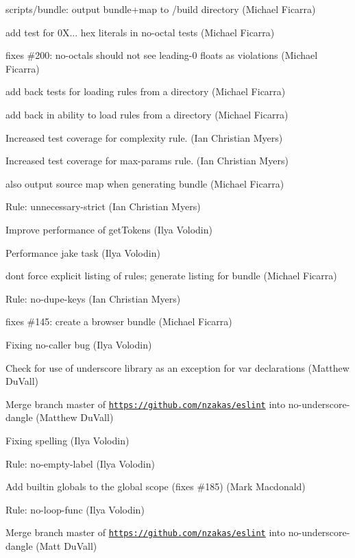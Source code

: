 \begin{DoxyItemize}
\item scripts/bundle\+: output bundle+map to /build directory (Michael Ficarra)
\item add test for 0X... hex literals in no-\/octal tests (Michael Ficarra)
\item fixes \#200\+: no-\/octals should not see leading-\/0 floats as violations (Michael Ficarra)
\item add back tests for loading rules from a directory (Michael Ficarra)
\item add back in ability to load rules from a directory (Michael Ficarra)
\item Increased test coverage for {\ttfamily complexity} rule. (Ian Christian Myers)
\item Increased test coverage for {\ttfamily max-\/params} rule. (Ian Christian Myers)
\item also output source map when generating bundle (Michael Ficarra)
\item Rule\+: unnecessary-\/strict (Ian Christian Myers)
\item Improve performance of get\+Tokens (Ilya Volodin)
\item Performance jake task (Ilya Volodin)
\item don\textquotesingle{}t force explicit listing of rules; generate listing for bundle (Michael Ficarra)
\item Rule\+: no-\/dupe-\/keys (Ian Christian Myers)
\item fixes \#145\+: create a browser bundle (Michael Ficarra)
\item Fixing no-\/caller bug (Ilya Volodin)
\item Check for use of underscore library as an exception for var declarations (Matthew Du\+Vall)
\item Merge branch \textquotesingle{}master\textquotesingle{} of \href{https://github.com/nzakas/eslint}{\tt https\+://github.\+com/nzakas/eslint} into no-\/underscore-\/dangle (Matthew Du\+Vall)
\item Fixing spelling (Ilya Volodin)
\item Rule\+: no-\/empty-\/label (Ilya Volodin)
\item Add builtin globals to the global scope (fixes \#185) (Mark Macdonald)
\item Rule\+: no-\/loop-\/func (Ilya Volodin)
\item Merge branch \textquotesingle{}master\textquotesingle{} of \href{https://github.com/nzakas/eslint}{\tt https\+://github.\+com/nzakas/eslint} into no-\/underscore-\/dangle (Matt Du\+Vall)

\end{DoxyItemize}
